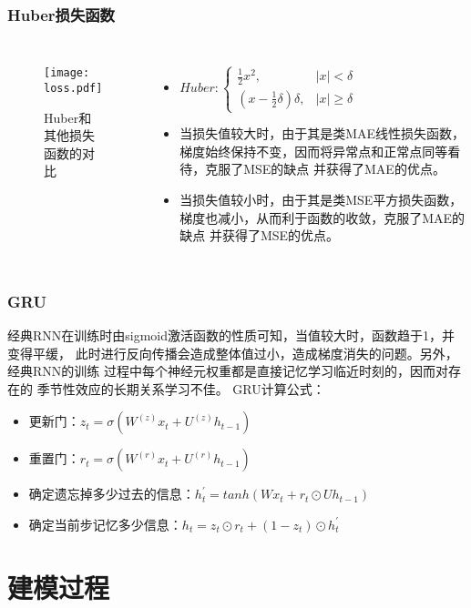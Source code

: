 \documentclass[14pt, AutoFakeBold]{ppt}
\begin{document}
\begin{frame}
  \frametitle{Huber损失函数}
  \begin{columns}
    \begin{figure}[H]
      \centering
      \texttt{[image: loss.pdf]}
      \caption{Huber和其他损失函数的对比}
      \label{fig_loss}
    \end{figure}
      \begin{itemize}
      \item $Huber:
      \left\{\begin{matrix}
          \frac{1}{2}x^{2}, & \left | x  \right | < \delta\\
          (x - \frac1 2 \delta)\delta, & \left | x  \right | \geq \delta
      \end{matrix}\right.$
      \item 当损失值较大时，由于其是类MAE线性损失函数，
      梯度始终保持不变，因而将异常点和正常点同等看待，克服了MSE的缺点
      并获得了MAE的优点。
      \item 当损失值较小时，由于其是类MSE平方损失函数，
      梯度也减小，从而利于函数的收敛，克服了MAE的缺点
      并获得了MSE的优点。
    \end{itemize}
  \end{columns}
\end{frame}

\begin{frame}
  \frametitle{GRU}
  经典RNN在训练时由sigmoid激活函数的性质可知，当值较大时，函数趋于1，并变得平缓，
  此时进行反向传播会造成整体值过小，造成梯度消失的问题。另外，经典RNN的训练
  过程中每个神经元权重都是直接记忆学习临近时刻的，因而对存在的
  季节性效应的长期关系学习不佳。
  \rightline{}
  GRU计算公式：
  \begin{itemize}
    \item 更新门：$z_t=\sigma(W^{(z)}x_t+U^{(z)}h_{t-1})$
    \item 重置门：$r_t=\sigma(W^{(r)}x_t+U^{(r)}h_{t-1})$
    \item 确定遗忘掉多少过去的信息：$h^{\prime}_t=tanh(Wx_t+r_t\odot Uh_{t-1})$
    \item 确定当前步记忆多少信息：$h_t=z_t\odot r_t+(1-z_t)\odot h^{\prime}_t$
  \end{itemize}
\end{frame}

\section{建模过程}
\end{document}
